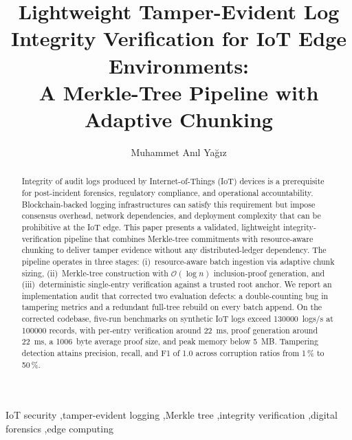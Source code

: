 \documentclass[preprint,12pt]{elsarticle}
\begin{document}

\begin{frontmatter}

\title{Lightweight Tamper-Evident Log Integrity Verification for IoT Edge Environments:\\
       A Merkle-Tree Pipeline with Adaptive Chunking}

\author[inst1]{Muhammet An\i l Ya\u{g}\i z}
\address[inst1]{Department of Computer Engineering, K\i r\i kkale University, K\i r\i kkale, Turkey}

\begin{abstract}
Integrity of audit logs produced by Internet-of-Things (IoT) devices is a prerequisite for post-incident forensics, regulatory compliance, and operational accountability.
Blockchain-backed logging infrastructures can satisfy this requirement but impose consensus overhead, network dependencies, and deployment complexity that can be prohibitive at the IoT edge.
This paper presents a validated, lightweight integrity-verification pipeline that combines Merkle-tree commitments with resource-aware chunking to deliver tamper evidence without any distributed-ledger dependency.
The pipeline operates in three stages: (i)~resource-aware batch ingestion via adaptive chunk sizing, (ii)~Merkle-tree construction with $\mathcal{O}(\log n)$ inclusion-proof generation, and (iii)~deterministic single-entry verification against a trusted root anchor.
We report an implementation audit that corrected two evaluation defects: a double-counting bug in tampering metrics and a redundant full-tree rebuild on every batch append.
On the corrected codebase, five-run benchmarks on synthetic IoT logs exceed \SI{130000}{logs/s} at \num{100000} records, with per-entry verification around \SI{22}{ms}, proof generation around \SI{22}{ms}, a \SI{1006}{byte} average proof size, and peak memory below \SI{5}{MB}.
Tampering detection attains precision, recall, and F1 of 1.0 across corruption ratios from 1\,\% to 50\,\%.
\end{abstract}

\begin{keyword}
IoT security \sep tamper-evident logging \sep Merkle tree \sep integrity verification \sep digital forensics \sep edge computing
\end{keyword}

\end{frontmatter}
\end{document}
